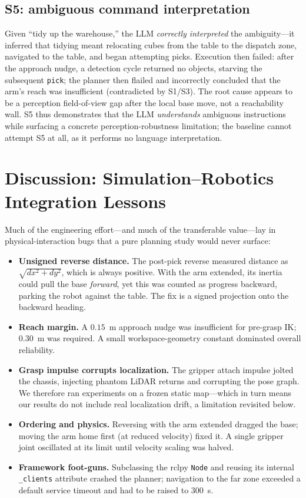 \documentclass[conference]{IEEEtran}
\begin{document}
\subsection{S5: ambiguous command interpretation}
Given ``tidy up the warehouse,'' the LLM \emph{correctly interpreted} the
ambiguity---it inferred that tidying meant relocating cubes from the table to the
dispatch zone, navigated to the table, and began attempting picks. Execution then
failed: after the approach nudge, a detection cycle returned no objects, starving
the subsequent \texttt{pick}; the planner then flailed and incorrectly concluded
that the arm's reach was insufficient (contradicted by S1/S3). The root cause
appears to be a perception field-of-view gap after the local base move, not a
reachability wall. S5 thus demonstrates that the LLM \emph{understands} ambiguous
instructions while surfacing a concrete perception-robustness limitation; the
baseline cannot attempt S5 at all, as it performs no language interpretation.

\section{Discussion: Simulation--Robotics Integration Lessons}\label{sec:lessons}
Much of the engineering effort---and much of the transferable value---lay in
physical-interaction bugs that a pure planning study would never surface:

\begin{itemize}
\item \textbf{Unsigned reverse distance.} The post-pick reverse measured distance
as $\sqrt{dx^2+dy^2}$, which is always positive. With the arm extended, its
inertia could pull the base \emph{forward}, yet this was counted as progress
backward, parking the robot against the table. The fix is a signed projection onto
the backward heading.
\item \textbf{Reach margin.} A $0.15$~m approach nudge was insufficient for
pre-grasp IK; $0.30$~m was required. A small workspace-geometry constant dominated
overall reliability.
\item \textbf{Grasp impulse corrupts localization.} The gripper attach impulse
jolted the chassis, injecting phantom LiDAR returns and corrupting the pose graph.
We therefore ran experiments on a frozen static map---which in turn means our
results do not include real localization drift, a limitation revisited below.
\item \textbf{Ordering and physics.} Reversing with the arm extended dragged the
base; moving the arm home first (at reduced velocity) fixed it. A single gripper
joint oscillated at its limit until velocity scaling was halved.
\item \textbf{Framework foot-guns.} Subclassing the rclpy \texttt{Node} and
reusing its internal \texttt{\_clients} attribute crashed the planner; navigation
to the far zone exceeded a default service timeout and had to be raised to
$300$~s.
\end{itemize}
\end{document}
